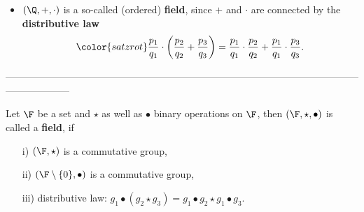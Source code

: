 {\begin{frame}
\begin{itemize}
		\item $(\Q,+, \cdot)$ is a so-called (ordered) \textbf{field}, since $+$ and $\cdot$ are connected by the \textbf{distributive law}
		\[\color{satzrot}
		\frac{p_1}{q_1}\cdot \left(\frac{p_2}{q_2}+\frac{p_3}{q_3}\right)=
		\frac{p_1}{q_1}\cdot \frac{p_2}{q_2}+\frac{p_1}{q_1}\cdot \frac{p_3}{q_3}.
		\]	
	\end{itemize}
	\vspace{0.8cm}
	\small
	--------------------------------------------------------------------------------------------------------------------------------\\
	\vspace{-0.3cm}
	\begin{defi}[Field]\label{def:field} 
		Let $\F$ be a set and $\star$ as well as $\bullet$  binary operations on $\F$, then $(\F, \star, \bullet)$ is called a \textbf{field}, if
		\begin{itemize}
			\item[i)] $(\F, \star)$ is a commutative group,
			\item[ii)] $(\F\setminus \{0\}, \bullet)$ is a commutative group,
			\item[iii)] distributive law: $g_1 \bullet ( g_2 \star g_3) =g_1 \bullet  g_2 \star g_1 \bullet  g_3$.
		\end{itemize}
	\end{defi}
\end{frame}

}
